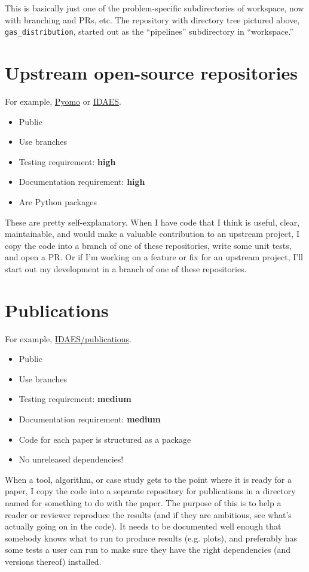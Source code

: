 \documentclass{article}
\begin{document}
This is basically just one of the problem-specific subdirectories of
workspace, now with branching and PRs, etc.
The repository with directory tree pictured above, \texttt{gas\_distribution},
started out as the ``pipelines'' subdirectory in ``workspace.''

\section{Upstream open-source repositories}
For example, \href{https://github.com/pyomo/pyomo}{Pyomo} or
\href{https://github.com/idaes/idaes-pse}{IDAES}.
\begin{itemize}
  \item Public
  \item Use branches
  \item Testing requirement: {\color{red}\bf high}
  \item Documentation requirement: {\color{red}\bf high}
  \item Are Python packages
\end{itemize}

These are pretty self-explanatory. When I have code that I think
is useful, clear, maintainable, and would make a valuable
contribution to an upstream project, I copy the code into a branch
of one of these repositories, write some unit tests, and open a PR.
Or if I'm working on a feature or fix for an upstream project,
I'll start out my development in a branch of one of these
repositories.

\section{Publications}
For example, \href{https://github.com/idaes/publications}{IDAES/publications}.
\begin{itemize}
  \item Public
  \item Use branches
  \item Testing requirement: {\color{purple}\bf medium}
  \item Documentation requirement: {\color{purple}\bf medium}
  \item Code for each paper is structured as a package
  \item No unreleased dependencies!
\end{itemize}

When a tool, algorithm, or case study gets to the point where it is
ready for a paper, I copy the code into a separate repository for
publications in a directory named for something to do with the paper.
The purpose of this is to help a reader or reviewer reproduce the
results (and if they are ambitious, see what's actually going on
in the code).
It needs to be documented well enough that somebody knows what to run
to produce results (e.g. plots), and preferably has some tests a
user can run to make sure they have the right dependencies
(and versions thereof) installed.
\end{document}

